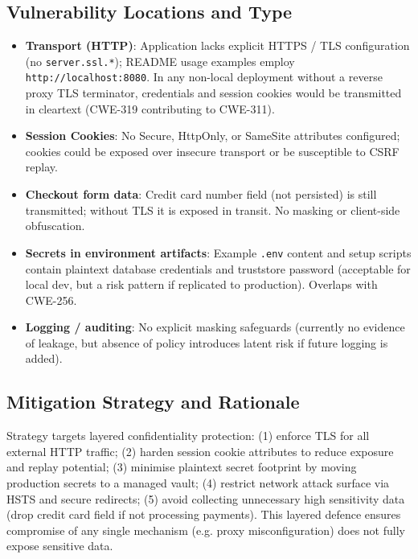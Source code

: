 \documentclass[]{UCD_CS_FYP_Report}
\begin{document}
\subsection{Vulnerability Locations and Type}
\begin{itemize}
	\item \textbf{Transport (HTTP)}: Application lacks explicit HTTPS / TLS configuration (no \texttt{server.ssl.*}); README usage examples employ \texttt{http://localhost:8080}. In any non-local deployment without a reverse proxy TLS terminator, credentials and session cookies would be transmitted in cleartext (CWE-319 contributing to CWE-311).
	\item \textbf{Session Cookies}: No Secure, HttpOnly, or SameSite attributes configured; cookies could be exposed over insecure transport or be susceptible to CSRF replay.
	\item \textbf{Checkout form data}: Credit card number field (not persisted) is still transmitted; without TLS it is exposed in transit. No masking or client-side obfuscation.
	\item \textbf{Secrets in environment artifacts}: Example \texttt{.env} content and setup scripts contain plaintext database credentials and truststore password (acceptable for local dev, but a risk pattern if replicated to production). Overlaps with CWE-256.
	\item \textbf{Logging / auditing}: No explicit masking safeguards (currently no evidence of leakage, but absence of policy introduces latent risk if future logging is added).
\end{itemize}

\subsection{Mitigation Strategy and Rationale}
Strategy targets layered confidentiality protection: (1) enforce TLS for all external HTTP traffic; (2) harden session cookie attributes to reduce exposure and replay potential; (3) minimise plaintext secret footprint by moving production secrets to a managed vault; (4) restrict network attack surface via HSTS and secure redirects; (5) avoid collecting unnecessary high sensitivity data (drop credit card field if not processing payments). This layered defence ensures compromise of any single mechanism (e.g. proxy misconfiguration) does not fully expose sensitive data.
\end{document}
